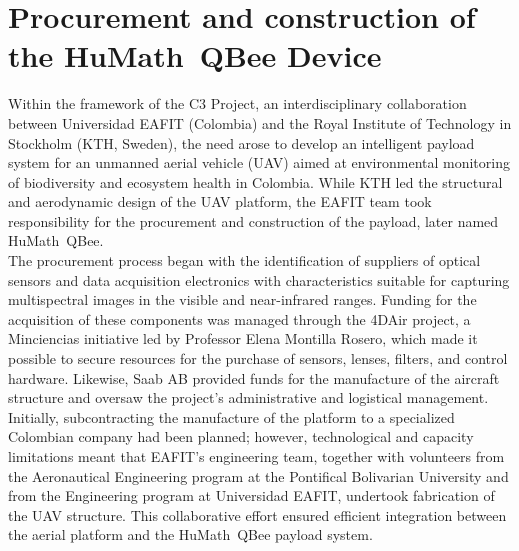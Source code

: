 


\chapter{Procurement and construction of the HuMath\textregistered\ QBee Device}
\label{Chapter3} 

\noindent Within the framework of the C3 Project, an interdisciplinary collaboration between Universidad EAFIT (Colombia) and the Royal Institute of Technology in Stockholm (KTH, Sweden), the need arose to develop an intelligent payload system for an unmanned aerial vehicle (UAV) aimed at environmental monitoring of biodiversity and ecosystem health in Colombia. While KTH led the structural and aerodynamic design of the UAV platform, the EAFIT team took responsibility for the procurement and construction of the payload, later named HuMath\textregistered\ QBee.\\

\noindent The procurement process began with the identification of suppliers of optical sensors and data acquisition electronics with characteristics suitable for capturing multispectral images in the visible and near-infrared ranges. Funding for the acquisition of these components was managed through the 4DAir project, a Minciencias initiative led by Professor Elena Montilla Rosero, which made it possible to secure resources for the purchase of sensors, lenses, filters, and control hardware. Likewise, Saab AB provided funds for the manufacture of the aircraft structure and oversaw the project’s administrative and logistical management.\\

\noindent Initially, subcontracting the manufacture of the platform to a specialized Colombian company had been planned; however, technological and capacity limitations meant that EAFIT’s engineering team, together with volunteers from the Aeronautical Engineering program at the Pontifical Bolivarian University and from the Engineering program at Universidad EAFIT, undertook fabrication of the UAV structure. This collaborative effort ensured efficient integration between the aerial platform and the HuMath\textregistered\ QBee payload system.\\

